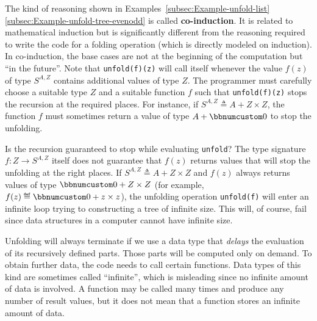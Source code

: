 The kind of reasoning shown in Examples~\ref{subsec:Example-unfold-list}\textendash \ref{subsec:Example-unfold-tree-evenodd}
is called \textbf{co-induction}. It is related
to mathematical induction but is significantly different from the
reasoning required to write the code for a folding operation (which
is directly modeled on induction). In co-induction, the base cases
are not at the beginning of the computation but \textsf{``}in the future\textsf{''}.
Note that \lstinline!unfold(f)(z)! will call itself whenever the
value $f(z)$ of type $S^{A,Z}$ contains additional values of type
$Z$. The programmer must carefully choose a suitable type $Z$ and
a suitable function $f$ such that \lstinline!unfold(f)(z)! stops
the recursion at the required places. For instance, if $S^{A,Z}\triangleq A+Z\times Z$,
the function $f$ must sometimes return a value of type $A+\bbnum 0$
to stop the unfolding.

Is the recursion guaranteed to stop while evaluating \lstinline!unfold!?
The type signature $f:Z\rightarrow S^{A,Z}$ itself does not guarantee
that $f(z)$ returns values that will stop the unfolding at the right
places. If $S^{A,Z}\triangleq A+Z\times Z$ and $f(z)$ always returns
values of type $\bbnum 0+Z\times Z$ (for example, $f(z)\triangleq\bbnum 0+z\times z$),
the unfolding operation \lstinline!unfold(f)! will enter an infinite
loop trying to constructing a tree of infinite size. This will, of
course, fail since data structures in a computer cannot have infinite
size.

Unfolding will always terminate if we use a data type that \emph{delays}
the evaluation of its recursively defined parts. Those parts will
be computed only on demand. To obtain further data, the code needs
to call certain functions. Data types of this kind are sometimes called
\textsf{``}infinite\textsf{''}, which is misleading since
no infinite amount of data is involved. A function may be called many
times and produce any number of result values, but it does not mean
that a function stores an infinite amount of data.

